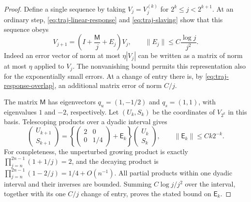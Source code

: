 \begin{proof}
Define a single sequence by taking \(V_j=V_j^{(k)}\) for
\(2^k\le j<2^{k+1}\).  At an ordinary step,
\eqref{eq:traj-linear-response} and \eqref{eq:traj-slaving} show
that this sequence obeys
\[
 V_{j+1}=\left(I+\frac{\mathsf M}{j}+E_j\right)V_j,
 \qquad \|E_j\|\le C\frac{\log j}{j^2}.
\]
Indeed an error vector of norm at most \(\eta|V_j|\) can be
written as a matrix of norm at most \(\eta\) applied to \(V_j\).
The nonvanishing bound permits this representation also for the
exponentially small errors.  At a change of entry there is, by
\eqref{eq:traj-response-overlap}, an additional matrix error of
norm \(C/j\).

The matrix \(\mathsf M\) has eigenvectors
\(q_u=(1,-1/2)\) and \(q_s=(1,1)\), with eigenvalues \(1\) and
\(-2\), respectively.  Let \((U_k,S_k)\) be the coordinates of
\(V_{2^k}\) in this basis.  Telescoping products over a dyadic
interval gives
\begin{equation}\label{eq:traj-epoch}
 \begin{pmatrix}U_{k+1}\\S_{k+1}\end{pmatrix}
 =\left\{
   \begin{pmatrix}2&0\\0&1/4\end{pmatrix}+\mathsf E_k
   \right\}
   \begin{pmatrix}U_k\\S_k\end{pmatrix},
 \qquad \|\mathsf E_k\|\le Ck2^{-k}.
\end{equation}
For completeness, the unperturbed growing product is exactly
\(\prod_{j=n}^{2n-1}(1+1/j)=2\), and the decaying product is
\(\prod_{j=n}^{2n-1}(1-2/j)=1/4+O(n^{-1})\).
All partial products within one dyadic interval and their inverses
are bounded.  Summing \(C\log j/j^2\) over the interval, together
with its one \(C/j\) change of entry, proves the stated bound on
\(\mathsf E_k\).


\end{proof}
